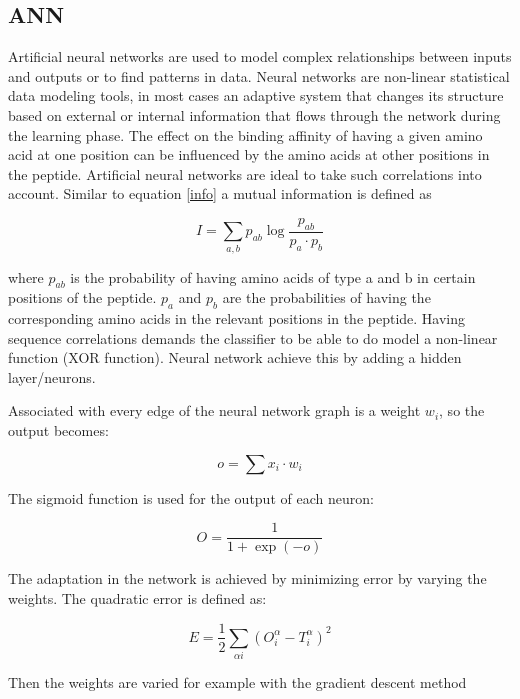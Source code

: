 \subsection*{ANN}
Artificial neural networks are used to model complex relationships between inputs and outputs or to find patterns in data.
Neural networks are non-linear statistical data modeling tools, in most cases an adaptive system that changes its structure based on external or internal information that flows through the network during the learning phase.
The effect on the binding affinity of
having a given amino acid at one
position can be influenced by the
amino acids at other positions in the
peptide. Artificial neural networks are
ideal to take such
correlations into account. Similar to equation \ref{info} a mutual information is defined as

\begin{equation}
\label{mutinfo}
I = \sum_{a,b}{ p_{ab}\log{ \frac{ p_{ab} }{ p_a \cdot p_b } } }
\end{equation}

where $p_{ab}$ is the probability of having amino acids of type a and b in certain positions of the peptide. $p_a$ and $p_b$ are the probabilities of having the corresponding amino acids in the relevant positions in the peptide.
Having sequence correlations demands the classifier to be able to do model a non-linear function (XOR function). Neural network achieve this by adding a hidden layer/neurons.

Associated with every edge of the neural network graph is a weight $w_i$, so the output becomes:

\begin{equation}
o = \sum{x_i \cdot w_i}
\end{equation}

The sigmoid function is used for the output of each neuron:

\begin{equation}
O = \frac{1}{1+\exp{(-o)}}
\end{equation}

The adaptation in the network is achieved by minimizing error by varying the weights. The quadratic error is defined as:

\begin{equation}
E = \frac{1}{2}\sum_{\alpha i}{(O_i^\alpha - T_i^\alpha)^2}
\end{equation}

Then the weights are varied for example with the gradient descent method


